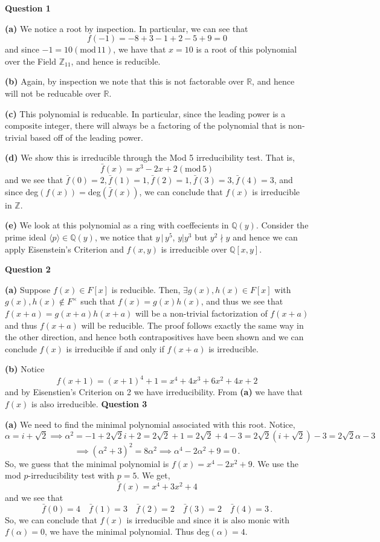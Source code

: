 \documentclass[10pt]{article}
\newcommand{\Z}{\mathbb{Z}}
\newcommand{\R}{\mathbb{R}}
\newcommand{\Q}{\mathbb{Q}}
\begin{document}
\textbf{Question 1}

\textbf{(a)} We notice a root by inspection. In particular, we can see that
\[ f(-1) = -8 + 3 -1 + 2 - 5 + 9 = 0 \]
and since $-1 = 10 (\text{mod} \, 11)$, we have that $x= 10$ is a root of this polynomial over the Field $\Z_{11}$, and hence is reducible.

\textbf{(b)} Again, by inspection we note that this is not factorable over $\R$, and hence will not be reducable over $\R$.

\textbf{(c)} This polynomial is reducable. In particular, since the leading power is a composite integer, there will always be a factoring of the polynomial that is non-trivial based off of the leading power. 

\textbf{(d)} We show this is irreducible through the Mod 5 irreducibility test. That is,
\[ \bar{f}(x) = x^{3} - 2x+2 (\text{mod}\, 5)\]
and we see that $\bar{f}(0) = 2, \bar{f}(1) = 1,\bar{f}(2) = 1,\bar{f}(3) = 3,\bar{f}(4) = 3$, and since deg$(f(x)) = $deg$(\bar{f}(x))$, we can conclude that $f(x)$ is irreducible in $\Z$.

\textbf{(e)} We look at this polynomial as a ring with coeffecients in $\Q (y)$. Consider the prime ideal $\langle p \rangle \in \Q(y)$, we notice that $y\, |\, y^{5}$, $y | y^{3}$ but $y^{2} \nmid y$ and hence we can apply Eisenstein's Criterion and $f(x,y)$ is irreducible over $\Q [x,y]$.

\newpage
\textbf{Question 2}

\textbf{(a)} Suppose $f(x)\in F[x]$ is reducible. Then, $\exists g(x),h(x)\in F[x]$ with $g(x),h(x)\notin F^{\times}$ such that $f(x) = g(x)h(x)$, and thus we see that $f(x+a) = g(x+a)h(x+a)$ will be a non-trivial factorization of $f(x+a)$ and thus $f(x+a)$ will be reducible. The proof follows exactly the same way in the other direction, and hence both contrapositives have been shown and we can conclude $f(x)$ is irreducible if and only if $f(x+a)$ is irreducible.

\textbf{(b)} Notice
\[ f(x+1) = (x+1)^{4} + 1 = x^{4} + 4x^{3} + 6x^{2} + 4x + 2 \]
and by Eisenstien's Criterion on 2 we have irreducibility. From \textbf{(a)} we have that $f(x)$ is also irreducible.
\newpage
\textbf{Question 3}

\textbf{(a)} We need to find the minimal polynomial associated with this root. Notice,
\[ \alpha = i + \sqrt{2} \implies \alpha^{2} = -1 + 2\sqrt{2}i + 2 = 2\sqrt{2} + 1 = 2\sqrt{2} + 4 - 3 = 2\sqrt{2}(i + \sqrt{2}) - 3 = 2\sqrt{2}\alpha - 3\]
\[ \implies (\alpha^{2} + 3)^{2} = 8\alpha^{2} \implies \alpha^{4} - 2\alpha^{2} + 9 = 0\, .\]
So, we guess that the minimal polynomial is $f(x) = x^{4} -2x^{2} + 9$. We use the mod $p$-irreducibility test with $p=5$. We get,
\[ \bar{f}(x) = x^{4} + 3x^{2} + 4\]
and we see that
\[ \bar{f}(0) = 4 \quad \bar{f}(1) = 3 \quad \bar{f}(2) = 2 \quad \bar{f}(3) = 2 \quad \bar{f}(4) = 3 \, .\]
So, we can conclude that $f(x)$ is irreducible and since it is also monic with $f(\alpha) = 0$, we have the minimal polynomial. Thus deg$(\alpha) = 4$.
\end{document}
